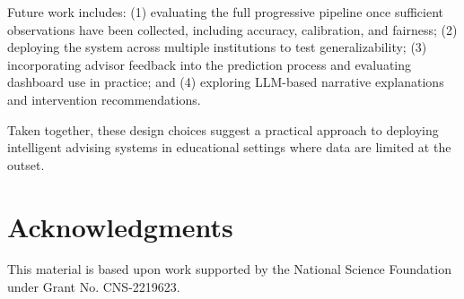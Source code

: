 \documentclass[letterpaper,11pt]{article}
\begin{document}
Future work includes: (1) evaluating the full progressive pipeline once sufficient observations have been collected, including accuracy, calibration, and fairness; (2) deploying the system across multiple institutions to test generalizability; (3) incorporating advisor feedback into the prediction process and evaluating dashboard use in practice; and (4) exploring LLM-based narrative explanations and intervention recommendations.

Taken together, these design choices suggest a practical approach to deploying intelligent advising systems in educational settings where data are limited at the outset.


\section{Acknowledgments}
\small

This material is based upon work supported by the National Science Foundation under Grant No. CNS-2219623.

\begin{sloppypar}
\printbibliography[title={REFERENCES}]
\end{sloppypar}
\end{document}
